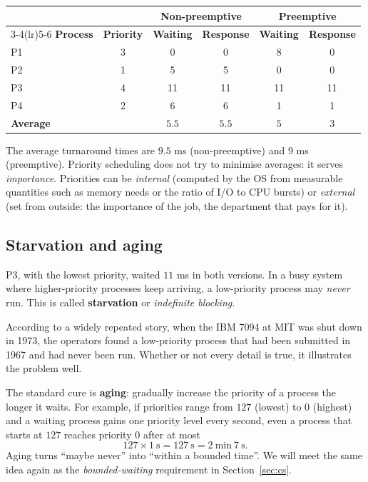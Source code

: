 \documentclass[11pt,a4paper]{article}
\newcommand{\term}[1]{\textbf{\color{mintdeep}#1}}
\begin{document}
\begin{center}
\renewcommand{\arraystretch}{1.2}
\begin{tabular}{@{}lccccc@{}}
\toprule
& & \multicolumn{2}{c}{\textbf{Non-preemptive}} & \multicolumn{2}{c}{\textbf{Preemptive}}\\
\cmidrule(lr){3-4}\cmidrule(lr){5-6}
\textbf{Process} & \textbf{Priority} & \textbf{Waiting} & \textbf{Response} & \textbf{Waiting} & \textbf{Response}\\
\midrule
P1 & 3 & 0 & 0 & 8 & 0\\
P2 & 1 & 5 & 5 & 0 & 0\\
P3 & 4 & 11 & 11 & 11 & 11\\
P4 & 2 & 6 & 6 & 1 & 1\\
\midrule
\textbf{Average} & & $5.5$ & $5.5$ & $5$ & $3$\\
\bottomrule
\end{tabular}
\end{center}

The average turnaround times are $9.5$ ms (non-preemptive) and $9$ ms (preemptive). Priority scheduling does not try to minimise averages: it serves \emph{importance}. Priorities can be \emph{internal} (computed by the OS from measurable quantities such as memory needs or the ratio of I/O to CPU bursts) or \emph{external} (set from outside: the importance of the job, the department that pays for it).

\subsection{Starvation and aging}

P3, with the lowest priority, waited $11$ ms in both versions. In a busy system where higher-priority processes keep arriving, a low-priority process may \emph{never} run. This is called \term{starvation} or \emph{indefinite blocking}.

\begin{histnote}
According to a widely repeated story, when the IBM 7094 at MIT was shut down in 1973, the operators found a low-priority process that had been submitted in 1967 and had never been run. Whether or not every detail is true, it illustrates the problem well.
\end{histnote}

The standard cure is \term{aging}: gradually increase the priority of a process the longer it waits. For example, if priorities range from $127$ (lowest) to $0$ (highest) and a waiting process gains one priority level every second, even a process that starts at $127$ reaches priority $0$ after at most
\[
127 \times 1\ \text{s} = 127\ \text{s} = 2\ \text{min}\ 7\ \text{s}.
\]
Aging turns ``maybe never'' into ``within a bounded time''. We will meet the same idea again as the \emph{bounded-waiting} requirement in Section~\ref{sec:cs}.
\end{document}
